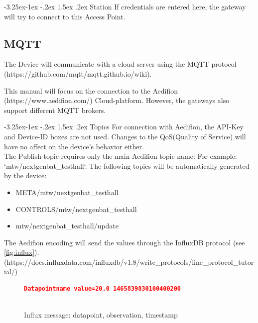 \documentclass[10pt,letterpaper]{article}
\makeatletter
\renewcommand\paragraph{\@startsection{paragraph}{4}{\z@}%
  {-3.25ex\@plus -1ex \@minus -.2ex}%
  {1.5ex \@plus .2ex}%
  {\normalfont\normalsize\bfseries}}
\makeatother
\begin{document}
		\paragraph{Station}
		If credentials are entered here, the gateway will try to connect to this Access Point.
\newpage
		\subsection{MQTT}
		The Device will communicate with a cloud server using the MQTT protocol (https://github.com/mqtt/mqtt.github.io/wiki).

		This manual will focus on the connection to the Aedifion (https://www.aedifion.com/) Cloud-platform. However, the gateways also support different MQTT brokers.

		\paragraph{Topics}
		For connection with Aedifion, the API-Key and Device-ID boxes are not used. Changes to the QoS(Quality of Service) will have no affect on the device's behavior either. \\
		The Publish topic requires only the main Aedifion topic name: For example: `mtw/nextgenbat\_testhall`.
		The following topics will be automatically generated by the device:
			\begin{itemize}
				\item META/mtw/nextgenbat\_testhall
				\item CONTROLS/mtw/nextgenbat\_testhall
				\item mtw/nextgenbat\_testhall/update
			\end{itemize}

		The Aedifion encoding will send the values through the InfluxDB protocol (see \autoref{fig:influx}).\\(https://docs.influxdata.com/influxdb/v1.8/write\_protocols/line\_protocol\_tutorial/)\\
		\begin{figure}[ht!]
		\begin{lstlisting}[language=json,firstnumber=1]
	Datapointname value=20.0 1465839830100400200
				
		\end{lstlisting}
		\caption{Influx message: datapoint, observation, timestamp}
		\label{fig:influx}
		\end{figure}
\end{document}
